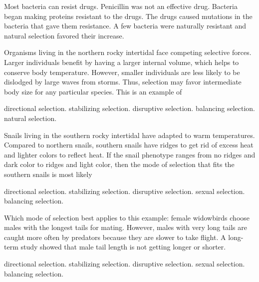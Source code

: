 \begin{choices}
\choice Most bacteria can resist drugs. %
\choice Penicillin was not an effective drug. %
\choice Bacteria began making proteins resistant to the drugs. %
\choice The drugs caused mutations in the bacteria that gave them resistance. %
\correctchoice A few bacteria were naturally resistant and natural selection favored their increase. %
\end{choices}

\question
Organisms living in the northern rocky intertidal face competing selective forces. Larger individuals benefit by having a larger internal volume, which helps to conserve body temperature. However, smaller individuals are less likely to be dislodged by large waves from storms. Thus, selection may favor intermediate body size for any particular species. This is an example of

\begin{choices}
\choice directional selection. %
\correctchoice stabilizing selection. %
\choice disruptive selection. %
\choice balancing selection. %
\choice natural selection. %
\end{choices}

\question
Snails living in the southern rocky intertidal have adapted to warm temperatures. Compared to northern snails, southern snails have ridges to get rid of excess heat and lighter colors to reflect heat. If the snail phenotype ranges from no ridges and dark color to ridges and light color, then the mode of selection that fits the southern snails is most likely

\begin{choices}
	\correctchoice directional selection. %
	\choice stabilizing selection. %
	\choice disruptive selection. %
	\choice sexual selection. %
	\choice balancing selection. %
\end{choices}


\question
Which mode of selection best applies to this example: female widowbirds choose males with the longest tails for mating. However, males with very long tails are caught more often by predators because they are slower to take flight. A long-term study showed that male tail length is not getting longer or shorter. 

\begin{choices}
	\choice directional selection. %
	\correctchoice stabilizing selection. %
	\choice disruptive selection. %
	\choice sexual selection. %
	\choice balancing selection. %
\end{choices}



